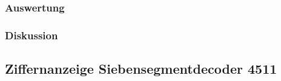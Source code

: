 \documentclass[12pt,a4paper]{article}
\begin{document}
\subsubsection*{Auswertung}
\subsubsection*{Diskussion}
\subsection{Ziffernanzeige Siebensegmentdecoder 4511}
\end{document}
